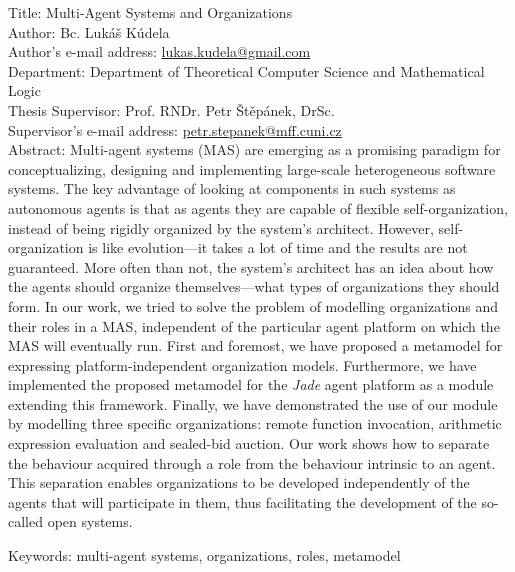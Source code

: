 
Title: Multi-Agent Systems and Organizations\\
Author: Bc. Lukáš Kúdela\\
Author's e-mail address: \url{lukas.kudela@gmail.com}\\
Department: Department of Theoretical Computer Science and Mathematical Logic\\
Thesis Supervisor: Prof. RNDr. Petr Štěpánek, DrSc.\\
Supervisor's e-mail address: \url{petr.stepanek@mff.cuni.cz}\\

Abstract: Multi-agent systems (MAS) are emerging as a promising paradigm for conceptualizing, designing and implementing large-scale heterogeneous software systems.
The key advantage of looking at components in such systems as autonomous agents is that as agents they are capable of flexible self-organization, instead of being rigidly organized by the system's architect.
However, self-organization is like evolution---it takes a lot of time and the results are not guaranteed.
More often than not, the system's architect has an idea about how the agents should organize themselves---what types of organizations they should form.
In our work, we tried to solve the problem of modelling organizations and their roles in a MAS, independent of the particular agent platform on which the MAS will eventually run.
First and foremost, we have proposed a metamodel for expressing platform-independent organization models.
Furthermore, we have implemented the proposed metamodel for the \textit{Jade} agent platform as a module extending this framework.
Finally, we have demonstrated the use of our module by modelling three specific organizations: remote function invocation, arithmetic expression evaluation and sealed-bid auction.
Our work shows how to separate the behaviour acquired through a role from the behaviour intrinsic to an agent. 
This separation enables organizations to be developed independently of the agents that will participate in them, thus facilitating the development of the so-called open systems.

Keywords: multi-agent systems, organizations, roles, metamodel